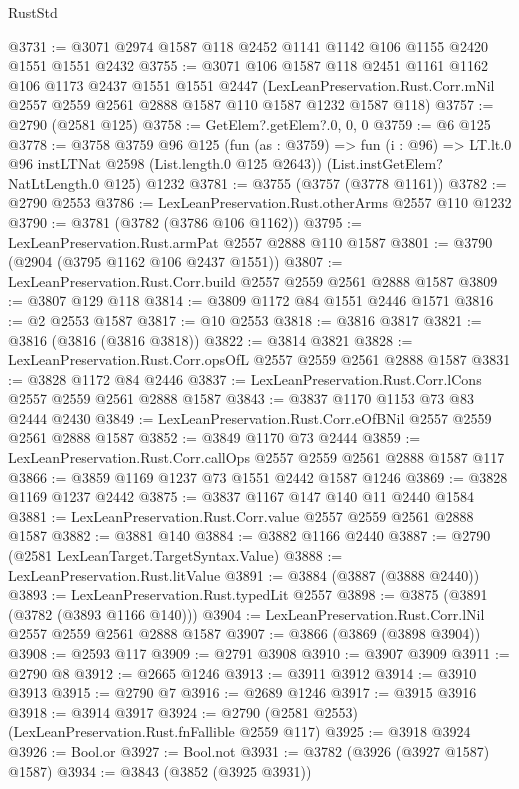 \begin{lexlean}{RustStd}
\begin{coremodule}
@3731 := @3071 @2974 @1587 @118 @2452 @1141 @1142 @106 @1155 @2420 @1551 @1551 @2432
@3755 := @3071
    @106
    @1587
    @118
    @2451
    @1161
    @1162
    @106
    @1173
    @2437
    @1551
    @1551
    @2447
    (LexLeanPreservation.Rust.Corr.mNil @2557 @2559 @2561 @2888 @1587 @110 @1587 @1232 @1587 @118)
@3757 := @2790 (@2581 @125)
@3758 := GetElem?.getElem?.{0, 0, 0}
@3759 := @6 @125
@3778 := @3758
    @3759
    @96
    @125
    (fun (as : @3759) =>
    fun (i : @96) => LT.lt.{0} @96 instLTNat @2598 (List.length.{0} @125 @2643))
    (List.instGetElem?NatLtLength.{0} @125)
    @1232
@3781 := @3755 (@3757 (@3778 @1161))
@3782 := @2790 @2553
@3786 := LexLeanPreservation.Rust.otherArms @2557 @110 @1232
@3790 := @3781 (@3782 (@3786 @106 @1162))
@3795 := LexLeanPreservation.Rust.armPat @2557 @2888 @110 @1587
@3801 := @3790 (@2904 (@3795 @1162 @106 @2437 @1551))
@3807 := LexLeanPreservation.Rust.Corr.build @2557 @2559 @2561 @2888 @1587
@3809 := @3807 @129 @118
@3814 := @3809 @1172 @84 @1551 @2446 @1571
@3816 := @2 @2553 @1587
@3817 := @10 @2553
@3818 := @3816 @3817
@3821 := @3816 (@3816 (@3816 @3818))
@3822 := @3814 @3821
@3828 := LexLeanPreservation.Rust.Corr.opsOfL @2557 @2559 @2561 @2888 @1587
@3831 := @3828 @1172 @84 @2446
@3837 := LexLeanPreservation.Rust.Corr.lCons @2557 @2559 @2561 @2888 @1587
@3843 := @3837 @1170 @1153 @73 @83 @2444 @2430
@3849 := LexLeanPreservation.Rust.Corr.eOfBNil @2557 @2559 @2561 @2888 @1587
@3852 := @3849 @1170 @73 @2444
@3859 := LexLeanPreservation.Rust.Corr.callOps @2557 @2559 @2561 @2888 @1587 @117
@3866 := @3859 @1169 @1237 @73 @1551 @2442 @1587 @1246
@3869 := @3828 @1169 @1237 @2442
@3875 := @3837 @1167 @147 @140 @11 @2440 @1584
@3881 := LexLeanPreservation.Rust.Corr.value @2557 @2559 @2561 @2888 @1587
@3882 := @3881 @140
@3884 := @3882 @1166 @2440
@3887 := @2790 (@2581 LexLeanTarget.TargetSyntax.Value)
@3888 := LexLeanPreservation.Rust.litValue
@3891 := @3884 (@3887 (@3888 @2440))
@3893 := LexLeanPreservation.Rust.typedLit @2557
@3898 := @3875 (@3891 (@3782 (@3893 @1166 @140)))
@3904 := LexLeanPreservation.Rust.Corr.lNil @2557 @2559 @2561 @2888 @1587
@3907 := @3866 (@3869 (@3898 @3904))
@3908 := @2593 @117
@3909 := @2791 @3908
@3910 := @3907 @3909
@3911 := @2790 @8
@3912 := @2665 @1246
@3913 := @3911 @3912
@3914 := @3910 @3913
@3915 := @2790 @7
@3916 := @2689 @1246
@3917 := @3915 @3916
@3918 := @3914 @3917
@3924 := @2790 (@2581 @2553) (LexLeanPreservation.Rust.fnFallible @2559 @117)
@3925 := @3918 @3924
@3926 := Bool.or
@3927 := Bool.not
@3931 := @3782 (@3926 (@3927 @1587) @1587)
@3934 := @3843 (@3852 (@3925 @3931))

\end{coremodule}
\end{lexlean}
